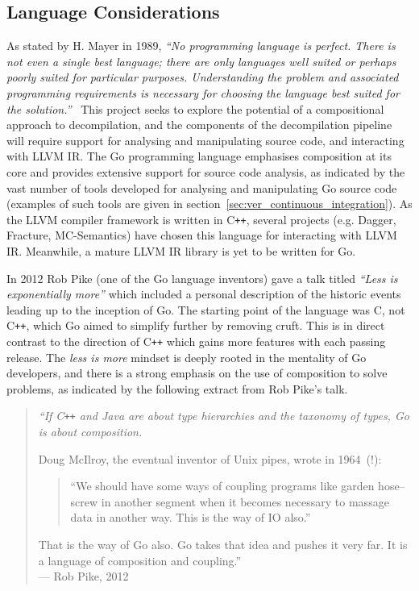 

\subsection{Language Considerations}

As stated by H. Mayer in 1989, \textit{``No programming language is perfect. There is not even a single best language; there are only languages well suited or perhaps poorly suited for particular purposes. Understanding the problem and associated programming requirements is necessary for choosing the language best suited for the solution.''}~\cite{no_perfect_lang_quote} This project seeks to explore the potential of a compositional approach to decompilation, and the components of the decompilation pipeline will require support for analysing and manipulating source code, and interacting with LLVM IR. The Go programming language emphasises composition at its core and provides extensive support for source code analysis, as indicated by the vast number of tools developed for analysing and manipulating Go source code (examples of such tools are given in section~\ref{sec:ver_continuous_integration}). As the LLVM compiler framework is written in C\texttt{++}, several projects (e.g. Dagger, Fracture, MC-Semantics) have chosen this language for interacting with LLVM IR. Meanwhile, a mature LLVM IR library is yet to be written for Go.

In 2012 Rob Pike (one of the Go language inventors) gave a talk titled \textit{``Less is exponentially more''} which included a personal description of the historic events leading up to the inception of Go. The starting point of the language was C, not C\texttt{++}, which Go aimed to simplify further by removing cruft. This is in direct contrast to the direction of C\texttt{++} which gains more features with each passing release. The \textit{less is more} mindset is deeply rooted in the mentality of Go developers, and there is a strong emphasis on the use of composition to solve problems, as indicated by the following extract from Rob Pike's talk.

\begin{quote}
	\itshape
	``If C\texttt{++} and Java are about type hierarchies and the taxonomy of types, Go is about composition.

	Doug McIlroy, the eventual inventor of Unix pipes, wrote in 1964~(!):

	\begin{quote}
		``We should have some ways of coupling programs like garden hose--screw in another segment when it becomes necessary to massage data in another way. This is the way of IO also.''
	\end{quote}

	That is the way of Go also. Go takes that idea and pushes it very far. It is a language of composition and coupling.'' \\

	\normalfont
	--- Rob Pike, 2012~\cite{less_is_more}
\end{quote}

